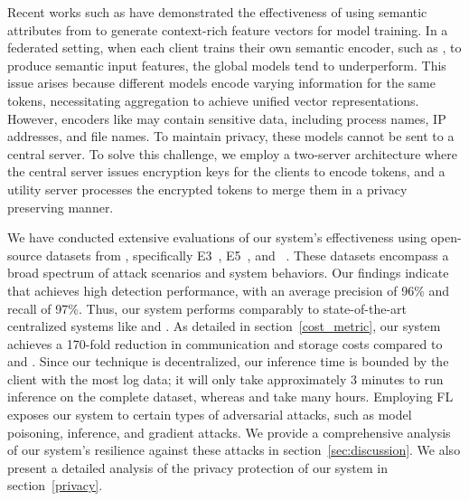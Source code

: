 Recent works such as \flash have demonstrated the effectiveness of using semantic attributes from \logs to generate context-rich feature vectors for model training. In a federated setting, when each client trains their own semantic encoder, such as \wordvec, to produce semantic input features, the global \gnnshort models tend to underperform. This issue arises because different models encode varying information for the same tokens, necessitating aggregation to achieve unified vector representations. However, encoders like \wordvec may contain sensitive data, including process names, IP addresses, and file names. To maintain privacy, these models cannot be sent to a central server. To solve this challenge, we employ a two-server architecture where the central server issues encryption keys for the clients to encode \wordvec tokens, and a utility server processes the encrypted tokens to merge them in a privacy preserving manner.




We have conducted extensive evaluations of our system's effectiveness using open-source datasets from \darpa, specifically E3~\cite{darpae3}, E5~\cite{darpae5}, and \optc~\cite{anjum2021analyzing}. These datasets encompass a broad spectrum of attack scenarios and system behaviors. Our findings indicate that \Sys achieves high detection performance, with an average precision of 96\% and recall of 97\%. Thus, our system performs comparably to state-of-the-art centralized systems like \flash and \kairos. As detailed in section~\ref{cost_metric}, our system achieves a 170-fold reduction in communication and storage costs compared to \flash and \kairos. Since our technique is decentralized, our inference time is bounded by the client with the most log data; it will only take approximately 3 minutes to run inference on the complete \optc dataset, whereas \flash and \kairos take many hours. Employing FL exposes our system to certain types of adversarial attacks, such as model poisoning, inference, and gradient attacks. We provide a comprehensive analysis of our system's resilience against these attacks in section~\ref{sec:discussion}. We also present a detailed analysis of the privacy protection of our system in section~\ref{privacy}.

